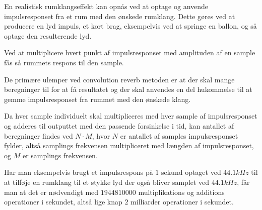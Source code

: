 En realistisk rumklangseffekt kan opnås ved at optage og anvende impulsresponset fra et rum med den ønskede rumklang.
Dette gøres ved at producere en lyd impuls, et kort brag, eksempelvis ved at springe en ballon, og så optage den resulterende lyd. 

Ved at multiplicere hvert punkt af impulsresponset med amplituden af en sample fås så rummets respons til den sample.

De primære ulemper ved convolution reverb metoden er at der skal mange beregninger til for at få resultatet og der skal anvendes en del hukommelse til at gemme impulsresponset fra rummet med den ønskede klang.

Da hver sample individuelt skal multipliceres med hver sample af impulsresponset og adderes til outputtet med den passende forsinkelse i tid, kan antallet af beregninger findes ved $N \cdot M$, hvor $N$ er antallet af samples impulsresponset fylder, altså samplings frekvensen multipliceret med længden af impulsresponset, og $M$ er samplings frekvensen.

Har man eksempelvis brugt et impulsrespons på $1$ sekund optaget ved $44.1\si{kHz}$ til at tilføje en rumklang til et stykke lyd der også bliver samplet ved $44.1\si{kHz}$, får man at det er nødvendigt med $1944810000$ multiplikations og additions  operationer i sekundet, altså lige knap $2$ milliarder operationer i sekundet. 

